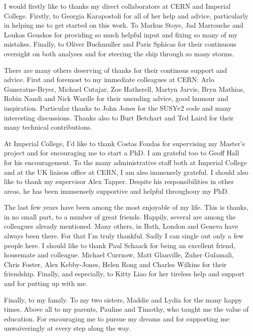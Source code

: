 \begin{acknowledgements}
  I would firstly like to thanks my direct collaborators at \ac{CERN} and
  Imperial College. Firstly, to Georgia Karapostoli for all of her help and
  advice, particularly in helping me to get started on this work. To Markus
  Stoye, Jad Marrouche and Loukas Gouskos for providing so much helpful input
  and fixing so many of my mistakes. Finally, to Oliver Buchmuller and Paris
  Sphicas for their continuous oversight on both analyses and for steering the
  ship through so many storms.

  There are many others deserving of thanks for their continous support and
  advice. First and foremost to my immediate colleagues at \ac{CERN}: Arlo
  Guneratne-Bryer, Michael Cutajar, Zoe Hatherell, Martyn Jarvis, Bryn Mathias,
  Robin Nandi and Nick Wardle for their unending advice, good humour and
  inspiration. Particular thanks to John Jones for the \ac{SUSYv2} code and many
  interesting discussions. Thanks also to Burt Betchart and Ted Laird for their
  many technical contributions.

  At Imperial College, I'd like to thank Costas Foudas for supervising my
  Master's project and for encouraging me to start a PhD. I am grateful too to
  Geoff Hall for his encouragement. To the many administrative staff both at
  Imperial College and at the UK liaison office at CERN, I am also immensely
  grateful. I should also like to thank my supervisor Alex Tapper. Despite his
  responsibilities in other areas, he has been immsensely supportive and helpful
  throughouy my PhD.

  The last few years have been among the most enjoyable of my life. This is
  thanks, in no small part, to a number of great friends. Happily, several are
  among the colleagues already mentioned. Many others, in Bath, London and
  Geneva have always been there. For that I'm truly thankful. Sadly I can single
  out only a few people here. I should like to thank Paul Schaack for being an
  excellent friend, housemate and colleague. Michael Currnow, Matt Glanville,
  Zuher Gulamali, Chris Foster, Alex Kebby-Jones, Helen Rong and Charles Wilkins
  for their friendship. Finally, and especially, to Kitty Liao for her tireless
  help and support and for putting up with me.

  Finally, to my family.  To my two sisters, Maddie and Lydia for the many happy
  times. Above all to my parents, Pauline and Timothy, who taught me the value
  of education. For encouraging me to pursue my dreams and for supporting me
  unwaiveringly at every step along the way.
\end{acknowledgements}


